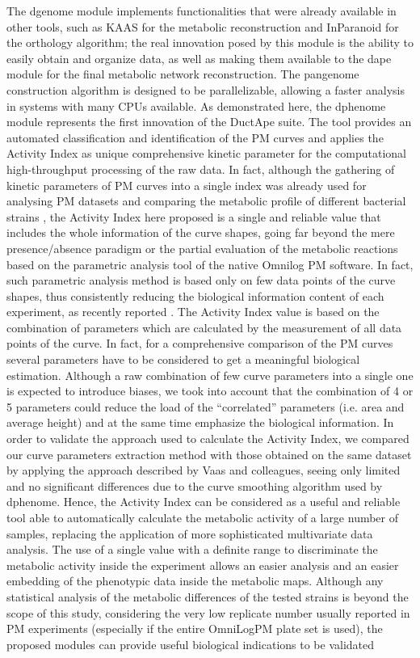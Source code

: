 The dgenome module implements functionalities that were already available in other tools, such as KAAS \cite{moriya2007kaas} for the metabolic reconstruction and InParanoid \cite{ostlund2010inparanoid} for the orthology algorithm; the real innovation posed by this module is the ability to easily obtain and organize data, as well as making them available to the dape module for the final metabolic network reconstruction. The pangenome construction algorithm is designed to be parallelizable, allowing a faster analysis in systems with many CPUs available. As demonstrated here, the dphenome module represents the first innovation of the DuctApe suite. The tool provides an automated classification and identification of the PM curves and applies the Activity Index as unique comprehensive kinetic parameter for the computational high-throughput processing of the raw data. In fact, although the gathering of kinetic parameters of PM curves into a single index was already used for analysing PM datasets and comparing the metabolic profile of different bacterial strains  \cite{biondi2009metabolic}, the Activity Index here proposed is a single and reliable value that includes the whole information of the curve shapes, going far beyond the mere presence/absence paradigm or the partial evaluation of the metabolic reactions based on the parametric analysis tool of the native Omnilog PM software. In fact, such parametric analysis method is based only on few data points of the curve shapes, thus consistently reducing the biological information content of each experiment, as recently reported \cite{vaas2012visualization}. The Activity Index value is based on the combination of parameters which are calculated by the measurement of all data points of the curve. In fact, for a comprehensive comparison of the PM curves several parameters have to be considered to get a meaningful biological estimation. Although a raw combination of few curve parameters into a single one is expected to introduce biases, we took into account that the combination of 4 or 5 parameters could reduce the load of the “correlated” parameters (i.e. area and average height) and at the same time emphasize the biological information. In order to validate the approach used to calculate the Activity Index, we compared our curve parameters extraction method with those obtained on the same dataset by applying the approach described by Vaas and colleagues, seeing only limited and no significant differences due to the curve smoothing algorithm used by dphenome. Hence, the Activity Index can be considered as a useful and reliable tool able to automatically calculate the metabolic activity of a large number of samples, replacing the application of more sophisticated multivariate data analysis. The use of a single value with a definite range to discriminate the metabolic activity inside the experiment allows an easier analysis and an easier embedding of the phenotypic data inside the metabolic maps. Although any statistical analysis of the metabolic differences of the tested strains is beyond the scope of this study, considering the very low replicate number usually reported in PM experiments (especially if the entire OmniLog\texttrademark PM plate set is used), the proposed modules can provide useful biological indications to be validated 